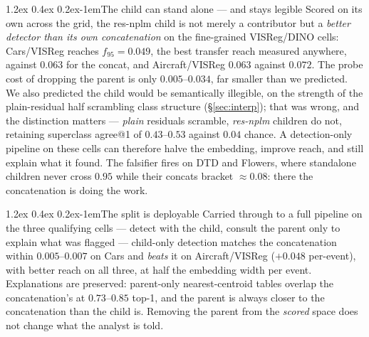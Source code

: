 \documentclass{article}
\makeatletter
\renewcommand\paragraph{\@startsection{paragraph}{4}{\z@}%
  {1.2ex \@plus 0.4ex \@minus 0.2ex}{-1em}{\normalsize\bf}}
\makeatother
\begin{document}
\paragraph{The child can stand alone --- and stays legible}
Scored on its own across the grid, the res-nplm child is not merely a
contributor but a \emph{better detector than its own concatenation} on the
fine-grained VISReg/DINO cells: Cars/VISReg reaches $f_{95}=0.049$, the best
transfer reach measured anywhere, against $0.063$ for the concat, and
Aircraft/VISReg $0.063$ against $0.072$. The probe cost of dropping the parent
is only $0.005$--$0.034$, far smaller than we predicted. We also predicted the
child would be semantically illegible, on the strength of the plain-residual
half scrambling class structure (\S\ref{sec:interp}); that was wrong, and the
distinction matters --- \emph{plain} residuals scramble, \emph{res-nplm}
children do not, retaining superclass agree@1 of $0.43$--$0.53$ against $0.04$
chance. A detection-only pipeline on these cells can therefore halve the
embedding, improve reach, and still explain what it found. The falsifier fires
on DTD and Flowers, where standalone children never cross $0.95$ while their
concats bracket $\approx0.08$: there the concatenation is doing the work.

\paragraph{The split is deployable}
Carried through to a full pipeline on the three qualifying cells --- detect with
the child, consult the parent only to explain what was flagged --- child-only
detection matches the concatenation within $0.005$--$0.007$ on Cars and
\emph{beats} it on Aircraft/VISReg ($+0.048$ per-event), with better reach on
all three, at half the embedding width per event. Explanations are preserved:
parent-only nearest-centroid tables overlap the concatenation's at $0.73$--$0.85$
top-1, and the parent is always closer to the concatenation than the child is.
Removing the parent from the \emph{scored} space does not change what the
analyst is told.
\end{document}
